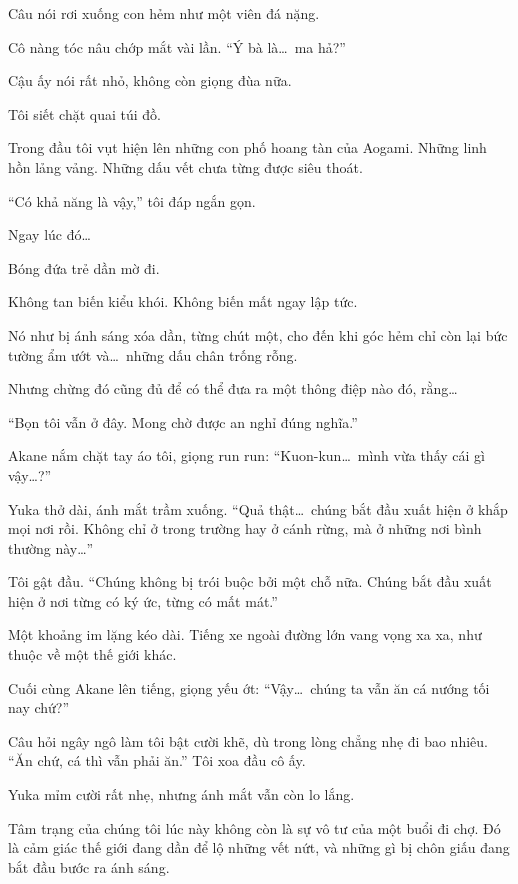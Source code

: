 \documentclass[../main.tex]{subfiles}
\begin{document}
Câu nói rơi xuống con hẻm như một viên đá nặng.

Cô nàng tóc nâu chớp mắt vài lần. ``Ý bà là\dots\ ma hả?''

Cậu ấy nói rất nhỏ, không còn giọng đùa nữa.

Tôi siết chặt quai túi đồ.

Trong đầu tôi vụt hiện lên những con phố hoang tàn của Aogami. Những linh hồn lảng vảng. Những dấu vết chưa từng được siêu thoát.

``Có khả năng là vậy,'' tôi đáp ngắn gọn.

Ngay lúc đó\dots

Bóng đứa trẻ dần mờ đi.

Không tan biến kiểu khói. Không biến mất ngay lập tức.

Nó như bị ánh sáng xóa dần, từng chút một, cho đến khi góc hẻm chỉ còn lại bức tường ẩm ướt và\dots\ những dấu chân trống rỗng.

Nhưng chừng đó cũng đủ để có thể đưa ra một thông điệp nào đó, rằng\dots

\begin{center}
  ``Bọn tôi vẫn ở đây. Mong chờ được an nghỉ đúng nghĩa.''
\end{center}

Akane nắm chặt tay áo tôi, giọng run run: ``Kuon-kun\dots\ mình vừa thấy cái gì vậy\dots?''

Yuka thở dài, ánh mắt trầm xuống. ``Quả thật\dots\ chúng bắt đầu xuất hiện ở khắp mọi nơi rồi. Không chỉ ở trong trường hay ở cánh rừng, mà ở những nơi bình thường này\dots''

Tôi gật đầu. ``Chúng không bị trói buộc bởi một chỗ nữa. Chúng bắt đầu xuất hiện ở nơi từng có ký ức, từng có mất mát.''

Một khoảng im lặng kéo dài. Tiếng xe ngoài đường lớn vang vọng xa xa, như thuộc về một thế giới khác.

Cuối cùng Akane lên tiếng, giọng yếu ớt: ``Vậy\dots\ chúng ta vẫn ăn cá nướng tối nay chứ?''

Câu hỏi ngây ngô làm tôi bật cười khẽ, dù trong lòng chẳng nhẹ đi bao nhiêu. ``Ăn chứ, cá thì vẫn phải ăn.'' Tôi xoa đầu cô ấy.

Yuka mỉm cười rất nhẹ, nhưng ánh mắt vẫn còn lo lắng.

Tâm trạng của chúng tôi lúc này không còn là sự vô tư của một buổi đi chợ. Đó là cảm giác thế giới đang dần để lộ những vết nứt, và những gì bị chôn giấu đang bắt đầu bước ra ánh sáng.

\ct
\end{document}
